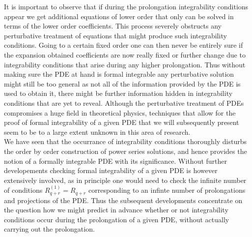 \documentclass[a4paper,12pt, DIV=14, BCOR=5mm, twoside, headsepline]{scrbook}
\begin{document}
It is important to observe that if during the prolongation integrability conditions appear we get additional equations of lower order that only can be solved in terms of the lower order coefficients. This process severely obstructs any perturbative treatment of equations that might produce such integrability conditions. Going to a certain fixed order one can then never be entirely sure if the expansion obtained coefficients are now really fixed or further change due to integrability conditions that arise during any higher prolongation.  Thus without making sure the PDE at hand is formal integrable any perturbative solution might still be too general as not all of the information provided by the PDE is used to obtain it, there might be further information hidden in integrability conditions that are yet to reveal. Although the perturbative treatment of PDEs compromises a huge field in theoretical physics, techniques that allow for the proof of formal integrability of a given PDE that we will subsequently present seem to be to a large extent unknown in this area of research. \\

We have seen that the occurrance of integrability conditions thoroughly disturbs the order by order construction of power series solutions, and hence provides the notion of a formally integrable PDE with its significance. Without further developements checking formal integrability of a given PDE is however extensively involved, as in principle one would need to check the infinite number of conditions $R_{q+r}^{(1)} = R_{q+r}$ corresponding to an infinte number of prolongations and projections of the PDE. Thus the subsequent developments concentrate on the question how we might predict in advance whether or not integrability conditions occur during the prolongation of a given PDE, without actually carrying out the prolongation.
\end{document}
